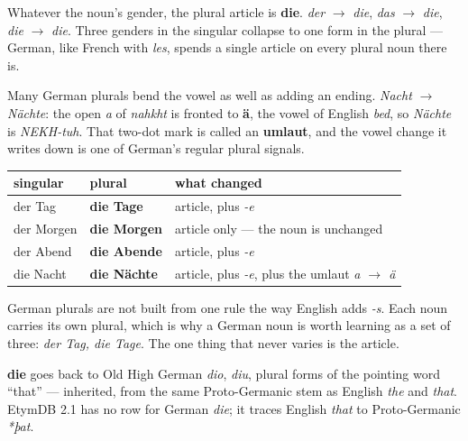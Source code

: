 Whatever the noun's gender, the plural article is \textbf{die}. \emph{der} $\to$ \emph{die}, \emph{das} $\to$ \emph{die}, \emph{die} $\to$ \emph{die}. Three genders in the singular collapse to one form in the plural — German, like French with \emph{les}, spends a single article on every plural noun there is.

\begin{sounds}
Many German plurals bend the vowel as well as adding an ending. \emph{Nacht} $\to$ \emph{Nächte}: the open \emph{a} of \emph{nahkht} is fronted to \textbf{ä}, the vowel of English \emph{bed}, so \emph{Nächte} is \emph{NEKH-tuh}. That two-dot mark is called an \textbf{umlaut}, and the vowel change it writes down is one of German's regular plural signals.
\end{sounds}

\begin{grammarlens}[title={Grammar Lens: the four day-parts in the plural}]
\noindent
\begin{tabularx}{\linewidth}{@{}>{\raggedright\arraybackslash}X>{\raggedright\arraybackslash}X>{\raggedright\arraybackslash}X@{}}
\toprule
\textbf{singular} & \textbf{plural} & \textbf{what changed} \\
\midrule
der Tag & \textbf{die Tage} & article, plus \emph{-e} \\
der Morgen & \textbf{die Morgen} & article only — the noun is unchanged \\
der Abend & \textbf{die Abende} & article, plus \emph{-e} \\
die Nacht & \textbf{die Nächte} & article, plus \emph{-e}, plus the umlaut \emph{a $\to$ ä} \\
\bottomrule
\end{tabularx}

German plurals are not built from one rule the way English adds \emph{-s}. Each noun carries its own plural, which is why a German noun is worth learning as a set of three: \emph{der Tag, die Tage}. The one thing that never varies is the article.
\end{grammarlens}

\begin{cousinweb}
\textbf{die} goes back to Old High German \emph{dio}, \emph{diu}, plural forms of the pointing word \textquotedblleft{}that\textquotedblright{} — inherited, from the same Proto-Germanic stem as English \emph{the} and \emph{that}. EtymDB 2.1 has no row for German \emph{die}; it traces English \emph{that} to Proto-Germanic \emph{*þat}.
\end{cousinweb}

